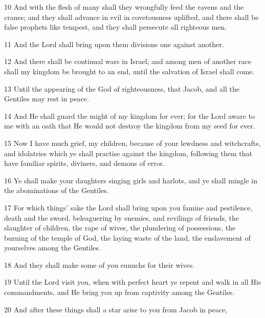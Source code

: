 \par 10 And with the flesh of many shall they wrongfully feed the ravens and the cranes; and they shall advance in evil in covetousness uplifted, and there shall be false prophets like tempest, and they shall persecute all righteous men.

\par 11 And the Lord shall bring upon them divisions one against another.

\par 12 And there shall be continual wars in Israel; and among men of another race shall my kingdom be brought to an end, until the salvation of Israel shall come.

\par 13 Until the appearing of the God of righteousness, that Jacob, and all the Gentiles may rest in peace.

\par 14 And He shall guard the might of my kingdom for ever; for the Lord aware to me with an oath that He would not destroy the kingdom from my seed for ever.

\par 15 Now I have much grief, my children, because of your lewdness and witchcrafts, and idolatries which ye shall practise against the kingdom, following them that have familiar spirits, diviners, and demons of error.

\par 16 Ye shall make your daughters singing girls and harlots, and ye shall mingle in the abominations of the Gentiles.

\par 17 For which things' sake the Lord shall bring upon you famine and pestilence, death and the sword, beleaguering by enemies, and revilings of friends, the slaughter of children, the rape of wives, the plundering of possessions, the burning of the temple of God, the laying waste of the land, the enslavement of yourselves among the Gentiles.

\par 18 And they shall make some of you eunuchs for their wives.

\par 19 Until the Lord visit you, when with perfect heart ye repent and walk in all His commandments, and He bring you up from captivity among the Gentiles.

\par 20 And after these things shall a star arise to you from Jacob in peace,

